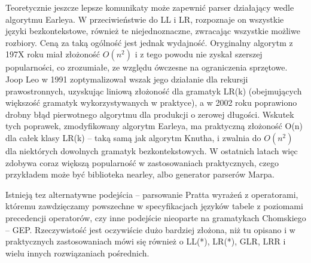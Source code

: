 Teoretycznie jeszcze lepsze komunikaty może zapewnić parser działający wedle algorytmu Earleya\cite{EARLEY_1970}. W przeciwieństwie do LL i LR, rozpoznaje on wszystkie języki bezkontekstowe, również te niejednoznaczne, zwracając wszystkie możliwe rozbiory. Ceną za taką ogólność jest jednak wydajność. Oryginalny algorytm z 197X roku miał złożoność $O(n^2)$ i z tego powodu nie zyskał szerszej popularności, co zrozumiałe, ze względu ówczesne na ograniczenia sprzętowe. Joop Leo w 1991 zoptymalizował wszak jego działanie dla rekursji prawostronnych, uzyskując liniową złożoność dla gramatyk LR(k)\cite{JOOP_LEO_1991} (obejmujących większość gramatyk wykorzystywanych w praktyce\cite{parsing_timeline_kegler}), a w 2002 roku poprawiono drobny błąd pierwotnego algorytmu dla produkcji o zerowej długości\cite{AYCOCK_HORSPOOL_NIGEL_2002}. Wskutek tych poprawek, zmodyfikowany algorytm Earleya, ma praktyczną złożoność O(n) dla całek klasy LR(k) – taką samą jak algorytm Knutha, i zwalnia do $O(n^2)$ dla niektórych dowolnych gramatyk bezkontekstowych.\cite{what_is_marpa_algorithm} W ostatnich latach więc zdobywa coraz większą popularność w zastosowaniach praktycznych, czego przykładem może być biblioteka nearley\cite{nearley}, albo generator parserów Marpa\cite{marpa_page}.

Istnieją tez alternatywne podejścia – parsowanie Pratta wyrażeń z operatorami, któremu zawdzięczamy powszechne w specyfikacjach języków tabele z poziomami precedencji operatorów, czy inne podejście nieoparte na gramatykach Chomskiego – GEP. Rzeczywistość jest oczywiście dużo bardziej złożona, niż tu opisano i w praktycznych zastosowaniach mówi się również o LL(*), LR(*), GLR, LRR i wielu innych rozwiązaniach pośrednich.

